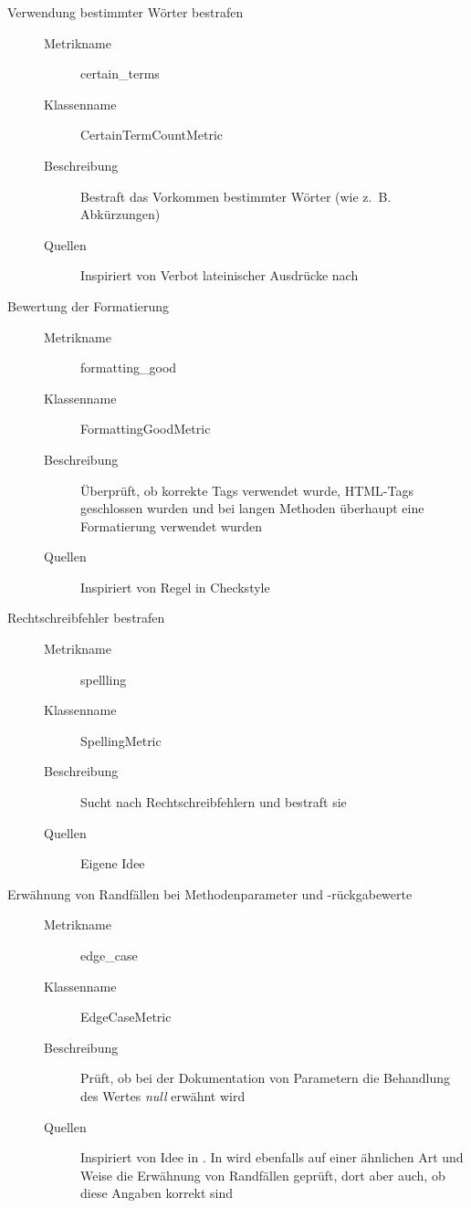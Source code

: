\begin{appendices}
\begin{description}
\item[Verwendung bestimmter Wörter bestrafen]
\begin{description}
\item[]
    \item [Metrikname]  certain\_terms
    \item [Klassenname] CertainTermCountMetric
    \item[Beschreibung]  Bestraft das Vorkommen bestimmter Wörter (wie z.~B. Abkürzungen)
     \item[Quellen] Inspiriert von Verbot lateinischer Ausdrücke nach \cite{HowtoWriteDocCommentsfortheJavadocTool}
\end{description}

\item[Bewertung der Formatierung]
\begin{description}
\item[]
    \item [Metrikname]  formatting\_good
    \item [Klassenname] FormattingGoodMetric
    \item[Beschreibung] Überprüft, ob korrekte Tags verwendet wurde, HTML-Tags geschlossen wurden und bei langen Methoden überhaupt eine Formatierung verwendet wurden
     \item[Quellen] Inspiriert von Regel in Checkstyle \cite{checkstyle_doc_metrics}
\end{description}

\clearpage
\item[Rechtschreibfehler bestrafen] 

\begin{description}
\item[]
    \item [Metrikname]  spellling
    \item [Klassenname] SpellingMetric
    \item[Beschreibung]Sucht nach Rechtschreibfehlern und bestraft sie
    \item[Quellen] Eigene Idee
\end{description}

\item[Erwähnung von Randfällen bei Methodenparameter
und -rückgabewerte]
\begin{description}
\item[]
    \item [Metrikname]  edge\_case
    \item [Klassenname] EdgeCaseMetric
    \item[Beschreibung] Prüft, ob bei der Dokumentation von Parametern die Behandlung des Wertes \textit{null} erwähnt wird
       \item[Quellen] Inspiriert von Idee in  \cite{javadoc_coding_standards}. In \cite[S.~1ff.]{@tComment:TestingJavadocCommentstoDetectComment-CodeInconsistencies} wird ebenfalls auf einer ähnlichen Art und Weise die Erwähnung von Randfällen geprüft, dort aber auch, ob diese Angaben korrekt sind
\end{description}



\end{description}
\end{appendices}
